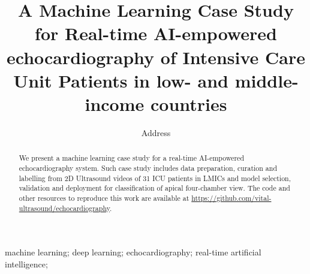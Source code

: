 \documentclass[mlabstract,twocolumn]{jmlr}
\title[Short Title]{
A Machine Learning Case Study for Real-time AI-empowered echocardiography of Intensive Care Unit Patients in low- and middle-income countries  %
}
\author{
     \Name{Anonymous Author(s)} \Email{email@sample.com}
      \addr Address
   }
\begin{document}
\maketitle

\begin{abstract}
We present a machine learning case study for a real-time AI-empowered echocardiography system.
Such case study includes data preparation, curation and labelling from 2D Ultrasound videos of 31 ICU patients in LMICs and model selection, validation and deployment for classification of apical four-chamber view.
The code and other resources to reproduce this work are available at \url{https://github.com/vital-ultrasound/echocardiography}.
\end{abstract}
\begin{keywords}
machine learning; deep learning; echocardiography; real-time artificial intelligence;
\end{keywords}
\end{document}
